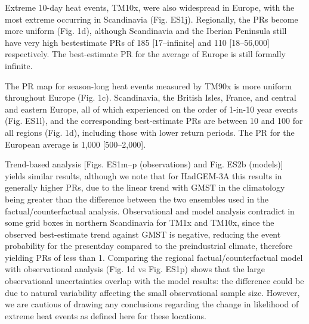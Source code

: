   Extreme 10-day heat events, TM10x, were also widespread in Europe, with the most extreme occurring in Scandinavia (Fig. ES1j). Regionally, the PRs become more uniform (Fig. 1d), although Scandinavia and the Iberian Peninsula still have very high bestestimate PRs of 185 [17--infinite] and 110 [18--56,000] respectively. The best-estimate PR for the average of Europe is still formally infinite. 

  The PR map for season-long heat events measured by TM90x is more uniform throughout Europe (Fig. 1c). Scandinavia, the British Isles, France, and central and eastern Europe, all of which experienced on the order of 1-in-10 year events (Fig. ES1l), and the corresponding best-estimate PRs are between 10 and 100 for all regions (Fig. 1d), including those with lower return periods. The PR for the European
  average is 1,000 [500--2,000].

  Trend-based analysis [Figs. ES1m--p (observations) and Fig. ES2b (models)] yields similar results, although we note that for HadGEM-3A this results in generally higher PRs, due to the linear trend with GMST in the climatology being greater than the difference between the two ensembles used in the factual/counterfactual analysis. Observational and model analysis contradict in some grid boxes in northern Scandinavia for TM1x and TM10x, since the observed best-estimate trend against GMST is negative, reducing the event probability for the presentday compared to the preindustrial climate, therefore yielding PRs of less than 1. Comparing the regional factual/counterfactual model with observational analysis (Fig. 1d vs Fig. ES1p) shows that the large observational uncertainties overlap with the model results: the difference could be due to natural variability affecting the small observational sample size. However, we are cautious of drawing any conclusions regarding the change in likelihood of extreme heat events as defined here for these locations.

